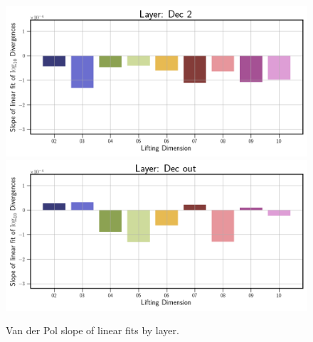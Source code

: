 \begin{figure}[!htbp]
\begin{minipage}{.5\textwidth}
        \includegraphics[width=\textwidth]{"../Figures/van_der_pol_slope_linear_fit_dec_2.png"} 
        \includegraphics[width=\textwidth]{"../Figures/van_der_pol_slope_linear_fit_dec_out.png"} 
    \end{minipage}
    \caption{Van der Pol slope of linear fits by layer.}
    \label{fig:van der pol slopes all layers}
\end{figure}

